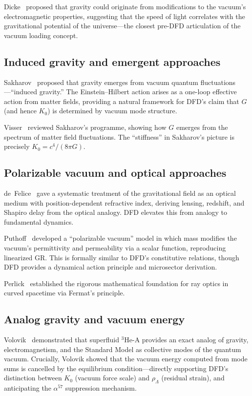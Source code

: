 \documentclass[aps,prd,twocolumn,superscriptaddress,nofootinbib]{revtex4-2}
\begin{document}
Dicke~\cite{Dicke1957} proposed that gravity could originate from
modifications to the vacuum's electromagnetic properties, suggesting
that the speed of light correlates with the gravitational potential of
the universe---the closest pre-DFD articulation of the vacuum loading
concept.

\subsection{Induced gravity and emergent approaches}

Sakharov~\cite{Sakharov1967} proposed that gravity emerges from vacuum
quantum fluctuations---``induced gravity.''  The Einstein--Hilbert
action arises as a one-loop effective action from matter fields,
providing a natural framework for DFD's claim that $G$ (and hence
$K_0$) is determined by vacuum mode structure.

Visser~\cite{Visser2002} reviewed Sakharov's programme, showing how
$G$ emerges from the spectrum of matter field fluctuations.  The
``stiffness'' in Sakharov's picture is precisely
$K_0 = c^4/(8\pi G)$.

\subsection{Polarizable vacuum and optical approaches}

de~Felice~\cite{deFelice1971} gave a systematic treatment of the
gravitational field as an optical medium with position-dependent
refractive index, deriving lensing, redshift, and Shapiro delay from
the optical analogy.  DFD elevates this from analogy to fundamental
dynamics.

Puthoff~\cite{Puthoff2002} developed a ``polarizable vacuum'' model
in which mass modifies the vacuum's permittivity and permeability via
a scalar function, reproducing linearized GR\@.  This is formally
similar to DFD's constitutive relations, though DFD provides a
dynamical action principle and microsector derivation.

Perlick~\cite{Perlick2000} established the rigorous mathematical
foundation for ray optics in curved spacetime via Fermat's principle.

\subsection{Analog gravity and vacuum energy}

Volovik~\cite{Volovik2003} demonstrated that superfluid $^3$He-A
provides an exact analog of gravity, electromagnetism, and the
Standard Model as collective modes of the quantum vacuum.  Crucially,
Volovik showed that the vacuum energy computed from mode sums is
cancelled by the equilibrium condition---directly supporting DFD's
distinction between $K_0$ (vacuum force scale) and $\rho_\Lambda$
(residual strain), and anticipating the $\alpha^{57}$ suppression
mechanism.
\end{document}
